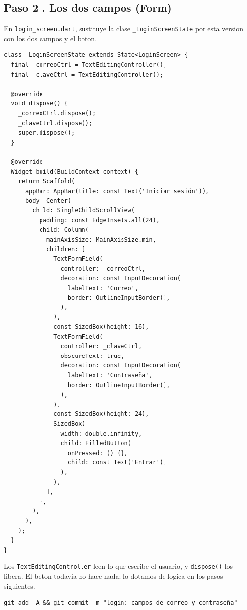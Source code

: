 \documentclass[11pt,a4paper,oneside]{book}
\newcommand{\file}[1]{\texttt{\textcolor{brandDark}{#1}}}
\begin{document}
\subsection*{Paso 2 . Los dos campos (Form)}
\begin{wherebox}
En \file{login\_screen.dart}, sustituye la clase \texttt{\_LoginScreenState} por esta
version con los dos campos y el boton.
\end{wherebox}

\begin{lstlisting}
class _LoginScreenState extends State<LoginScreen> {
  final _correoCtrl = TextEditingController();
  final _claveCtrl = TextEditingController();

  @override
  void dispose() {
    _correoCtrl.dispose();
    _claveCtrl.dispose();
    super.dispose();
  }

  @override
  Widget build(BuildContext context) {
    return Scaffold(
      appBar: AppBar(title: const Text('Iniciar sesión')),
      body: Center(
        child: SingleChildScrollView(
          padding: const EdgeInsets.all(24),
          child: Column(
            mainAxisSize: MainAxisSize.min,
            children: [
              TextFormField(
                controller: _correoCtrl,
                decoration: const InputDecoration(
                  labelText: 'Correo',
                  border: OutlineInputBorder(),
                ),
              ),
              const SizedBox(height: 16),
              TextFormField(
                controller: _claveCtrl,
                obscureText: true,
                decoration: const InputDecoration(
                  labelText: 'Contraseña',
                  border: OutlineInputBorder(),
                ),
              ),
              const SizedBox(height: 24),
              SizedBox(
                width: double.infinity,
                child: FilledButton(
                  onPressed: () {},
                  child: const Text('Entrar'),
                ),
              ),
            ],
          ),
        ),
      ),
    );
  }
}
\end{lstlisting}

\begin{whatbox}
Los \texttt{TextEditingController} leen lo que escribe el usuario, y \texttt{dispose()}
los libera. El boton todavia no hace nada: lo dotamos de logica en los pasos
siguientes.
\end{whatbox}

\begin{lstlisting}[language={},numbers=none]
git add -A && git commit -m "login: campos de correo y contraseña"
\end{lstlisting}
\end{document}
